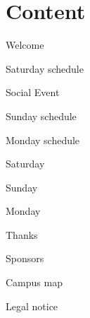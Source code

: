 \section*{Content}
\newlength\contentspace
\setlength\contentspace{\contentspace}

\vspace*{\contentspace}%
\noindent Welcome\dotfill \pageref{welcome}
%
%
%

\vspace*{\contentspace}%
\noindent Saturday schedule \dotfill \pageref{saturday}

\vspace*{\contentspace}%
\noindent Social Event \dotfill \pageref{social-event}

\vspace*{\contentspace}%
\noindent Sunday schedule \dotfill \pageref{sunday}

\vspace*{\contentspace}%
\noindent Monday schedule \dotfill \pageref{monday}

\vspace*{\contentspace}%
\noindent Saturday \dotfill \pageref{saturday-descriptions}

\vspace*{\contentspace}%
\noindent Sunday \dotfill \pageref{sunday-descriptions}

\vspace*{\contentspace}%
\noindent Monday \dotfill \pageref{monday-descriptions}

\vspace*{\contentspace}%
\noindent Thanks \dotfill \pageref{thanks}

\vspace*{\contentspace}%
\noindent Sponsors \dotfill \pageref{sponsors}
%

\vspace*{\contentspace}%
\noindent Campus map \dotfill \pageref{campus-map}

\vspace*{\contentspace}%
\noindent Legal notice \dotfill \pageref{legal}

